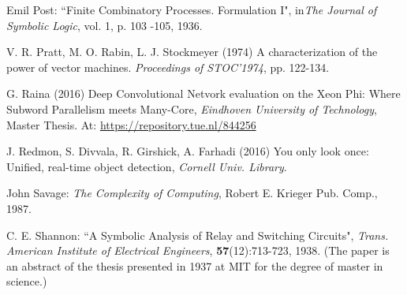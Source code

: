 {\begin{thebibliography}{}


 Emil Post: ``Finite Combinatory Processes.
 Formulation I", in{\em The Journal of Symbolic Logic}, vol. 1, p. 103 -105, 1936.

   V. R. Pratt, M. O. Rabin, L. J. Stockmeyer (1974)  A characterization of the power of vector machines. {\em Proceedings of STOC’1974}, pp. 122-134.

   G. Raina (2016) Deep Convolutional Netvork evaluation on the Xeon Phi: Where Subword Parallelism meets Many-Core, {\em Eindhoven University of Technology}, Master Thesis. At:  \url{https://repository.tue.nl/844256}

      J. Redmon,  S. Divvala,  R. Girshick, A.   Farhadi (2016) You only look once: Unified, real-time object detection,  {\em Cornell Univ. Library}.





 John Savage: {\em The Complexity of Computing}, Robert E. Krieger Pub. Comp., 1987.


 C. E. Shannon: ``A Symbolic Analysis of Relay and Switching Circuits", {\em Trans. American Institute of Electrical Engineers}, {\bf  57}(12):713-723, 1938. (The paper is an abstract of the thesis presented in 1937 at MIT for the degree of master in science.)


\end{thebibliography}}
